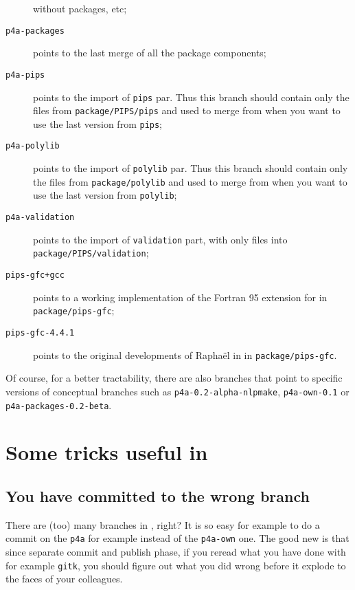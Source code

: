 \documentclass[a4paper]{article}
\begin{document}
\begin{description}
  without packages, etc;
\item[\texttt{p4a-packages}] points to the last merge of all the \Apfa
  package components;
\item[\texttt{p4a-pips}] points to the import of \Apips \texttt{pips}
  par. Thus this branch should contain only the files from
  \texttt{package/PIPS/pips} and used to merge from when you want to use
  the last version from \texttt{pips};
\item[\texttt{p4a-polylib}] points to the import of \Apips \texttt{polylib}
  par. Thus this branch should contain only the files from
  \texttt{package/polylib} and used to merge from when you want to use
  the last version from \texttt{polylib};
\item[\texttt{p4a-validation}] points to the import of \Apips
  \texttt{validation} part, with only files into
  \texttt{package/PIPS/validation};
\item[\texttt{pips-gfc+gcc}] points to a working \Apipsgfc implementation
  of the Fortran 95 extension for \Apips in \texttt{package/pips-gfc};
\item[\texttt{pips-gfc-4.4.1}] points to the original developments of
  Raphaël in \Agcc in \texttt{package/pips-gfc}.
\end{description}


Of course, for a better tractability, there are also branches that point
to specific versions of conceptual branches such as
\texttt{p4a-0.2-alpha-nlpmake}, \texttt{p4a-own-0.1} or
\texttt{p4a-packages-0.2-beta}.


\section{Some \protect\Agit tricks useful in \protect\Apfa}
\label{sec:some-agit-tricks}

\subsection{You have committed to the wrong branch}
\label{sec:you-have-comited}

There are (too) many branches in \Apfa, right? It is so easy for example
to do a commit on the \texttt{p4a} for example instead of the
\texttt{p4a-own} one. The good new is that since \Agit separate commit and
publish phase, if you reread what you have done with for example
\texttt{gitk}, you should figure out what you did wrong before it explode
to the faces of your colleagues.
\end{document}
